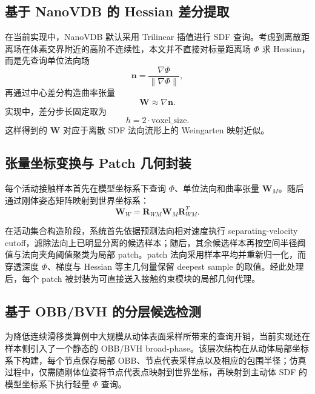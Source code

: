 \subsection{基于 NanoVDB 的 Hessian 差分提取}

在当前实现中，NanoVDB 默认采用 Trilinear 插值进行 SDF 查询\cite{museth2021nanovdb}。考虑到离散距离场在体素交界附近的高阶不连续性，本文并不直接对标量距离场 $\Phi$ 求 Hessian，而是先查询单位法向场
\begin{equation}
    \mathbf{n} = \frac{\nabla \Phi}{\|\nabla \Phi\|},
\end{equation}
再通过中心差分构造曲率张量
\begin{equation}
    \mathbf{W} \approx \nabla \mathbf{n}.
\end{equation}
实现中，差分步长固定取为
\begin{equation}
    h = 2 \cdot \text{voxel\_size}.
\end{equation}
这样得到的 $\mathbf{W}$ 对应于离散 SDF 法向流形上的 Weingarten 映射近似。

\subsection{张量坐标变换与 Patch 几何封装}

每个活动接触样本首先在模型坐标系下查询 $\Phi$、单位法向和曲率张量 $\mathbf{W}_M$。随后通过刚体姿态矩阵映射到世界坐标系：
\begin{equation}
    \mathbf{W}_W = \mathbf{R}_{WM}\mathbf{W}_M\mathbf{R}_{WM}^T.
\end{equation}

在活动集合构造阶段，系统首先依据预测法向相对速度执行 separating-velocity cutoff，滤除法向上已明显分离的候选样本；随后，其余候选样本再按空间半径阈值与法向夹角阈值聚类为局部 patch。patch 法向采用样本平均并重新归一化，而穿透深度 $\Phi$、梯度与 Hessian 等主几何量保留 deepest sample 的取值。经此处理后，每个 patch 被封装为可直接送入接触约束模块的局部几何代理。

\subsection{基于 OBB/BVH 的分层候选检测}

为降低连续滑移类算例中大规模从动体表面采样所带来的查询开销，当前实现还在样本侧引入了一个静态的 OBB/BVH broad-phase。该层次结构在从动体局部坐标系下构建，每个节点保存局部 OBB、节点代表采样点以及相应的包围半径；仿真过程中，仅需随刚体位姿将节点代表点映射到世界坐标，再映射到主动体 SDF 的模型坐标系下执行轻量 $\Phi$ 查询。

